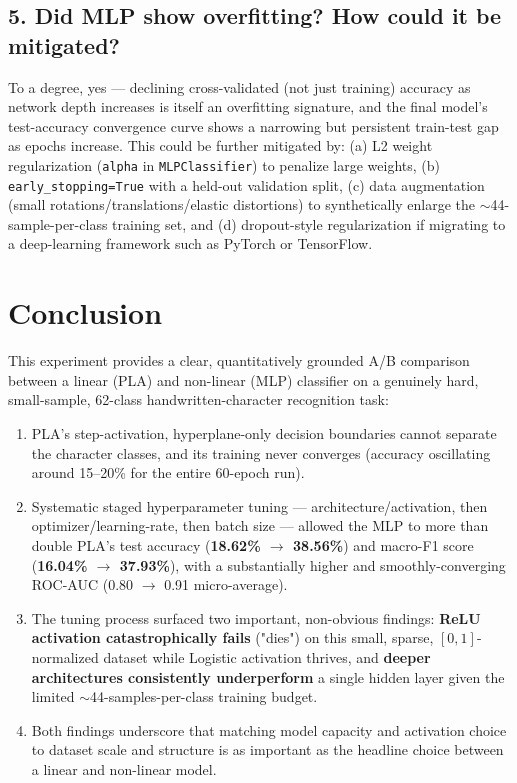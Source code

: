 \documentclass[12pt,a4paper]{article}
\begin{document}
\subsection{5. Did MLP show overfitting? How could it be mitigated?}
To a degree, yes — declining cross-validated (not just training) accuracy as network depth increases is itself an overfitting signature, and the final model's test-accuracy convergence curve shows a narrowing but persistent train-test gap as epochs increase. This could be further mitigated by: (a) L2 weight regularization (\texttt{alpha} in \texttt{MLPClassifier}) to penalize large weights, (b) \texttt{early\_stopping=True} with a held-out validation split, (c) data augmentation (small rotations/translations/elastic distortions) to synthetically enlarge the $\sim$44-sample-per-class training set, and (d) dropout-style regularization if migrating to a deep-learning framework such as PyTorch or TensorFlow.

\section{Conclusion}
This experiment provides a clear, quantitatively grounded A/B comparison between a linear (PLA) and non-linear (MLP) classifier on a genuinely hard, small-sample, 62-class handwritten-character recognition task:
\begin{enumerate}
\item PLA's step-activation, hyperplane-only decision boundaries cannot separate the character classes, and its training never converges (accuracy oscillating around 15--20\% for the entire 60-epoch run).
\item Systematic staged hyperparameter tuning — architecture/activation, then optimizer/learning-rate, then batch size — allowed the MLP to more than double PLA's test accuracy (\textbf{18.62\% $\to$ 38.56\%}) and macro-F1 score (\textbf{16.04\% $\to$ 37.93\%}), with a substantially higher and smoothly-converging ROC-AUC (0.80 $\to$ 0.91 micro-average).
\item The tuning process surfaced two important, non-obvious findings: \textbf{ReLU activation catastrophically fails} ("dies") on this small, sparse, $[0,1]$-normalized dataset while Logistic activation thrives, and \textbf{deeper architectures consistently underperform} a single hidden layer given the limited $\sim$44-samples-per-class training budget.
\item Both findings underscore that matching model capacity and activation choice to dataset scale and structure is as important as the headline choice between a linear and non-linear model.
\end{enumerate}
\end{document}
